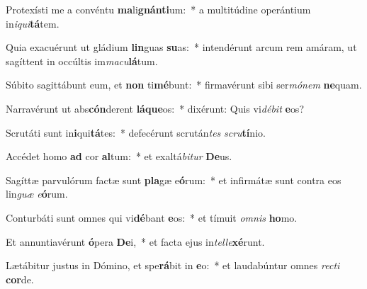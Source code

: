\item Protexísti me a convéntu \textbf{ma}li\textbf{gnán}\textbf{ti}um:~* a multitúdine operántium in\textit{i}\textit{qui}\textbf{tá}tem.
\item Quia exacuérunt ut gládium \textbf{lin}guas \textbf{su}as:~* intendérunt arcum rem amáram, ut sagíttent in occúltis im\textit{ma}\textit{cu}\textbf{lá}tum.
\item Súbito sagittábunt eum, et \textbf{non} ti\textbf{mé}bunt:~* firmavérunt sibi ser\textit{mó}\textit{nem} \textbf{ne}quam.
\item Narravérunt ut abs\textbf{cón}derent \textbf{lá}\textbf{que}os:~* dixérunt: Quis vi\textit{dé}\textit{bit} \textbf{e}os?
\item Scrutáti sunt in\textbf{i}qui\textbf{tá}tes:~* defecérunt scrután\textit{tes} \textit{scru}\textbf{tí}nio.
\item Accédet homo \textbf{ad} cor \textbf{al}tum:~* et exaltá\textit{bi}\textit{tur} \textbf{De}us.
\item Sagíttæ parvulórum factæ sunt \textbf{pla}gæ e\textbf{ó}rum:~* et infirmátæ sunt contra eos lin\textit{guæ} \textit{e}\textbf{ó}rum.
\item Conturbáti sunt omnes qui vi\textbf{dé}bant \textbf{e}os:~* et tímuit \textit{om}\textit{nis} \textbf{ho}mo.
\item Et annuntiavérunt \textbf{ó}pera \textbf{De}i,~* et facta ejus in\textit{tel}\textit{le}\textbf{xé}runt.
\item Lætábitur justus in Dómino, et spe\textbf{rá}bit in \textbf{e}o:~* et laudabúntur omnes \textit{rec}\textit{ti} \textbf{cor}de.
